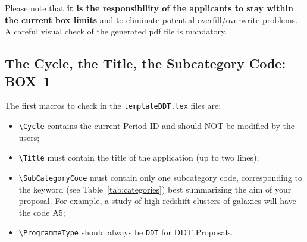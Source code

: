 \documentclass{article}
\begin{document}
Please note that {\bf it is the responsibility of the 
  applicants to stay 
  within the current box limits} and to eliminate potential
  overfill/overwrite problems. A careful visual check of the
  generated pdf file is mandatory.


\subsection{The Cycle, the Title, the Subcategory Code: {\bf BOX~1}}

The first macros to check in the {\tt templateDDT.tex} files are:
\begin{itemize}
\item \verb|\Cycle| contains the current Period ID 
  and should NOT be modified by the users;
\item \verb|\Title| must contain the title of the application (up to
  two lines);
\item \verb|\SubCategoryCode| must contain only one subcategory code,
  corresponding to the keyword (see Table~\ref{tab:categories}) best
  summarizing the aim of your proposal.  For example, a study of
  high-redshift clusters of galaxies will have the code A5;
\item \verb|\ProgrammeType| should always be {\tt DDT} for DDT Proposals.
\end{itemize}

\end{document}

